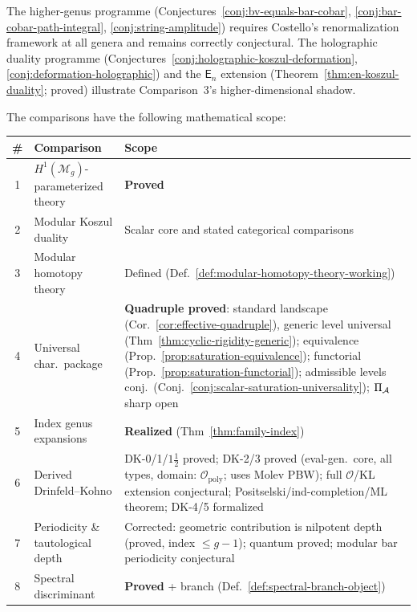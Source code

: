 The higher-genus programme
(Conjectures~\ref{conj:bv-equals-bar-cobar},
\ref{conj:bar-cobar-path-integral},
\ref{conj:string-amplitude}) requires Costello's
renormalization framework at all genera and remains correctly
conjectural.  The holographic duality programme
(Conjectures~\ref{conj:holographic-koszul-deformation},
\ref{conj:deformation-holographic}) and the $\mathsf{E}_n$
extension (Theorem~\ref{thm:en-koszul-duality}; proved) illustrate
Comparison~3's higher-dimensional shadow.

\medskip

\begin{remark}\label{rem:nine-futures-summary}
The comparisons have the following mathematical scope:
\begin{center}
\renewcommand{\arraystretch}{1.2}
\begin{tabular}{@{}clp{5.5cm}@{}}
\toprule
\textbf{\#} & \textbf{Comparison} & \textbf{Scope} \\
\midrule
1 & $H^1(\mathcal{M}_g)$-parameterized theory & \textbf{Proved} \\
2 & Modular Koszul duality & Scalar core and stated categorical comparisons \\
3 & Modular homotopy theory & Defined (Def.~\ref{def:modular-homotopy-theory-working}) \\
4 & Universal char.\ package & \textbf{Quadruple proved}: standard landscape (Cor.~\ref{cor:effective-quadruple}), generic level universal (Thm~\ref{thm:cyclic-rigidity-generic}); equivalence (Prop.~\ref{prop:saturation-equivalence}); functorial (Prop.~\ref{prop:saturation-functorial}); admissible levels conj.\ (Conj.~\ref{conj:scalar-saturation-universality}); $\Pi_{\mathcal{A}}$ sharp open \\
5 & Index genus expansions & \textbf{Realized} (Thm~\ref{thm:family-index}) \\
6 & Derived Drinfeld--Kohno & DK-0/1/$1\frac{1}{2}$ proved; DK-2/3 proved (eval-gen.\ core, all types, domain: $\mathcal{O}_{\mathrm{poly}}$; uses Molev PBW); full $\mathcal{O}$/KL extension conjectural; Positselski/ind-completion/ML theorem; DK-4/5 formalized \\
7 & Periodicity \& tautological depth & Corrected: geometric contribution is nilpotent depth (proved, index $\leq g-1$); quantum proved; modular bar periodicity conjectural \\
8 & Spectral discriminant & \textbf{Proved} + branch (Def.~\ref{def:spectral-branch-object}) \\

\end{tabular}
\end{center}
\end{remark}
